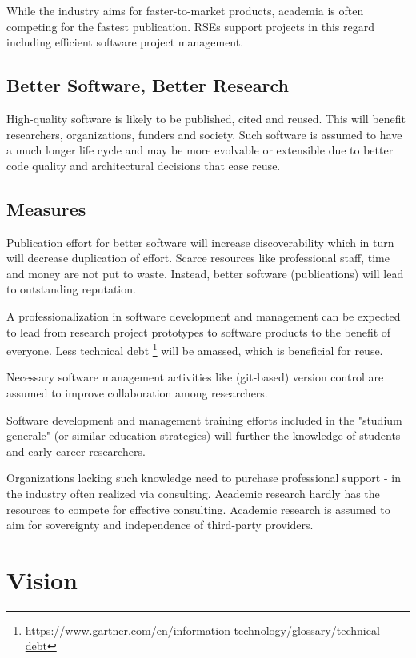 \documentclass{article}
\begin{document}
While the industry aims for faster-to-market products, academia is often competing for the fastest publication.
RSEs support projects in this regard including efficient software project management.

\subsection{Better Software, Better Research}

High-quality software is likely to be published, cited and reused.
This will benefit researchers, organizations, funders and society.
Such software is assumed to have a much longer life cycle and may be more evolvable or extensible due to better code quality and architectural decisions that ease reuse.

\subsection{Measures}

Publication effort for better software will increase discoverability which in turn will decrease duplication of effort.
Scarce resources like professional staff, time and money are not put to waste. Instead, better software (publications) will lead to outstanding reputation.

A professionalization in software development and management can be expected to lead from research project prototypes to software products to the benefit of everyone.
Less technical debt \footnote{\url{https://www.gartner.com/en/information-technology/glossary/technical-debt}} will be amassed, which is beneficial for reuse.

Necessary software management activities like (git-based) version control are assumed to improve collaboration among researchers.

Software development and management training efforts included in the "studium generale" (or similar education strategies) will further the knowledge of students and early career researchers.

Organizations lacking such knowledge need to purchase professional support - in the industry often realized via consulting.
Academic research hardly has the resources to compete for effective consulting.
Academic research is assumed to aim for sovereignty and independence of third-party providers.

\section{Vision}
\end{document}
